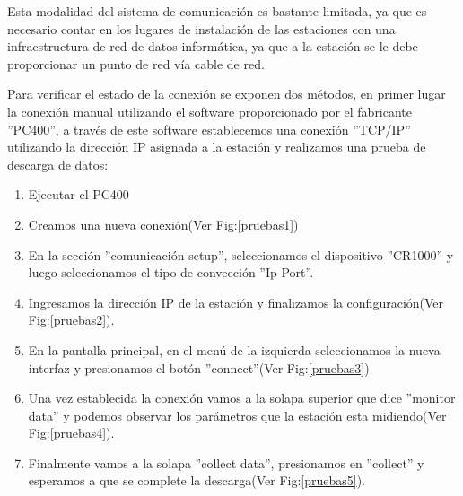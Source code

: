 Esta modalidad del sistema de comunicación es bastante limitada, ya que es necesario contar en los lugares de instalación de las estaciones con una infraestructura de red de datos informática, ya que a la estación se le debe proporcionar un punto de red vía cable de red.

Para verificar el estado de la conexión se exponen dos métodos, en primer lugar la conexión manual utilizando el software proporcionado por el fabricante ''PC400'', a través de este software establecemos una conexión ''TCP/IP'' utilizando la dirección IP asignada a la estación y realizamos una prueba de descarga de datos:

\begin{enumerate}
\item Ejecutar el PC400
\item Creamos una nueva conexión(Ver Fig:\ref{pruebas1}) 
\item En la sección ''comunicación setup'', seleccionamos el dispositivo ''CR1000'' y luego seleccionamos el tipo de convección ''Ip Port''.
\item Ingresamos la dirección IP de la estación y finalizamos la configuración(Ver Fig:\ref{pruebas2}).
\item En la pantalla principal, en el menú de la izquierda seleccionamos la nueva interfaz y presionamos el botón ''connect''(Ver Fig:\ref{pruebas3})
\item Una vez establecida la conexión vamos a la solapa superior que dice ''monitor data'' y podemos observar los parámetros que la estación esta midiendo(Ver Fig:\ref{pruebas4}).
\item Finalmente vamos a la solapa ''collect data'', presionamos en ''collect'' y esperamos a que se complete la descarga(Ver Fig:\ref{pruebas5}).
\end{enumerate}

